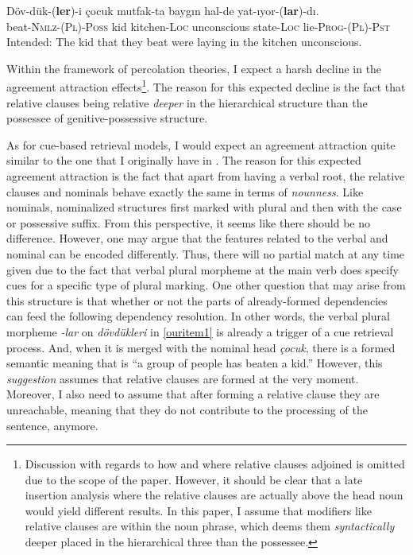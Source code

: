 \documentclass[doc]{apa6}
\let\rmarkdownfootnote\footnote%
\def\footnote{\protect\rmarkdownfootnote}
\begin{document}
\begin{exe}
  \ex \label{ouritem1}
      \gll D\"{o}v-d\"{u}k-(\textbf{ler})-i \c{c}ocuk mutfak-ta bayg{\i}n hal-de yat-{\i}yor-(\textbf{lar})-d{\i}.\\
  beat-\textsc{Nmlz}-(\textsc{Pl})-\textsc{Poss} kid kitchen-\textsc{Loc} unconscious state-\textsc{Loc} lie-\textsc{Prog}-(\textsc{Pl})-\textsc{Pst}\\
      \glt Intended: The kid that they beat were laying in the kitchen unconscious.
\end{exe}

Within the framework of percolation theories, I expect a harsh decline in the agreement attraction effects\footnote{Discussion with regards to how and where relative clauses adjoined is omitted due to the scope of the paper. However, it should be clear that a late insertion analysis where the relative clauses are actually above the head noun would yield different results. In this paper, I assume that modifiers like relative clauses are within the noun phrase, which deems them \textit{syntactically} deeper placed in the hierarchical three than the possessee.}. The reason for this expected decline is the fact that relative clauses being relative \emph{deeper} in the hierarchical structure than the possessee of genitive-possessive structure.

As for cue-based retrieval models, I would expect an agreement attraction quite similar to the one that I originally have in \textcite{Lago2018}. The reason for this expected agreement attraction is the fact that apart from having a verbal root, the relative clauses and nominals behave exactly the same in terms of \emph{nounness}. Like nominals, nominalized structures first marked with plural and then with the case or possessive suffix. From this perspective, it seems like there should be no difference. However, one may argue that the features related to the verbal and nominal can be encoded differently. Thus, there will no partial match at any time given due to the fact that verbal plural morpheme at the main verb does specify cues for a specific type of plural marking. One other question that may arise from this structure is that whether or not the parts of already-formed dependencies can feed the following dependency resolution. In other words, the verbal plural morpheme \emph{-lar} on \emph{dövdükleri} in \autoref{ouritem1} is already a trigger of a cue retrieval process. And, when it is merged with the nominal head \emph{çocuk}, there is a formed semantic meaning that is \enquote{a group of people has beaten a kid.} However, this \emph{suggestion} assumes that relative clauses are formed at the very moment. Moreover, I also need to assume that after forming a relative clause they are unreachable, meaning that they do not contribute to the processing of the sentence, anymore.
\end{document}
